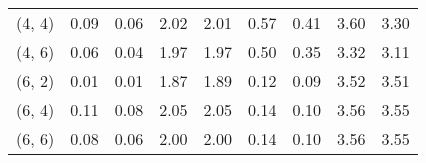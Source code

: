 \begin{tabular}{lrrrrrrrr}
(4, 4)        &                                               0.09 &                                            0.06 &                            2.02 &                                  2.01 &                                               0.57 &                                            0.41 &                            3.60 &                                  3.30 \\
(4, 6)        &                                               0.06 &                                            0.04 &                            1.97 &                                  1.97 &                                               0.50 &                                            0.35 &                            3.32 &                                  3.11 \\
(6, 2)        &                                               0.01 &                                            0.01 &                            1.87 &                                  1.89 &                                               0.12 &                                            0.09 &                            3.52 &                                  3.51 \\
(6, 4)        &                                               0.11 &                                            0.08 &                            2.05 &                                  2.05 &                                               0.14 &                                            0.10 &                            3.56 &                                  3.55 \\
(6, 6)        &                                               0.08 &                                            0.06 &                            2.00 &                                  2.00 &                                               0.14 &                                            0.10 &                            3.56 &                                  3.55 \\
\bottomrule
\end{tabular}
